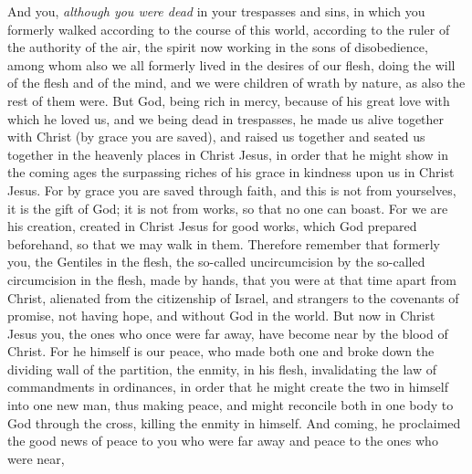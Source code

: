 \begin{biblechapter} %
 And you, \textit{although you were dead} in your trespasses and sins,
\verse in which you formerly walked according to the course of this world, according to the ruler of the authority of the air, the spirit now working in the sons of disobedience,
\verse among whom also we all formerly lived in the desires of our flesh, doing the will of the flesh and of the mind, and we were children of wrath by nature, as also the rest of them were.
\verse But God, being rich in mercy, because of his great love with which he loved us,
\verse and we being dead in trespasses, he made us alive together with Christ (by grace you are saved),
\verse and raised us together and seated us together in the heavenly places in Christ Jesus,
\verse in order that he might show in the coming ages the surpassing riches of his grace in kindness upon us in Christ Jesus.
\verse For by grace you are saved through faith, and this is not from yourselves, it is the gift of God;
\verse it is not from works, so that no one can boast.
\verse For we are his creation, created in Christ Jesus for good works, which God prepared beforehand, so that we may walk in them.
 Therefore remember that formerly you, the Gentiles in the flesh, the so-called uncircumcision by the so-called circumcision in the flesh, made by hands,
\verse that you were at that time apart from Christ, alienated from the citizenship of Israel, and strangers to the covenants of promise, not having hope, and without God in the world.
\verse But now in Christ Jesus you, the ones who once were far away, have become near by the blood of Christ.
\verse For he himself is our peace, who made both one and broke down the dividing wall of the partition, the enmity, in his flesh,
\verse invalidating the law of commandments in ordinances, in order that he might create the two in himself into one new man, thus making peace,
\verse and might reconcile both in one body to God through the cross, killing the enmity in himself.
\verse And coming, he proclaimed the good news of peace to you who were far away and peace to the ones who were near,

\end{biblechapter}
